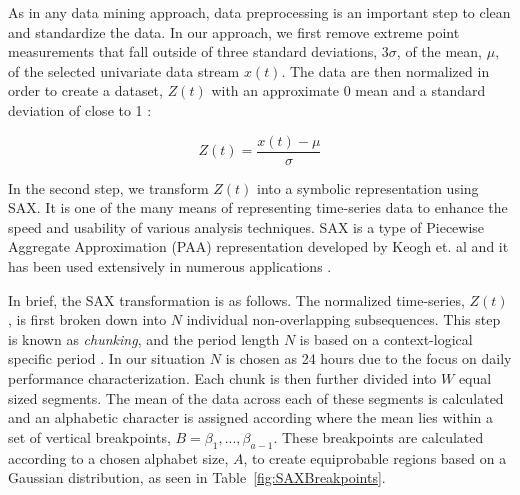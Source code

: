 As in any data mining approach, data preprocessing is an important step to clean and standardize the data. In our approach, we first remove extreme point measurements that fall outside of three standard deviations, 3$\sigma$, of the mean, $\mu$, of the selected univariate data stream $x(t)$. The data are then normalized in order to create a dataset, $Z(t)$ with an approximate 0 mean and a standard deviation of close to 1 \cite{goldin_similiarity_1995}:

\begin{equation}
Z(t)=\frac{x(t) -\mu}{\sigma}
\end{equation}

In the second step, we transform $Z(t)$ into a symbolic representation using SAX. It is one of the many means of representing time-series data to enhance the speed and usability of various analysis techniques. SAX is a type of Piecewise Aggregate Approximation (PAA) representation developed by Keogh et. al and it has been used extensively in numerous applications \cite{lin_experiencing_2007}. 

In brief, the SAX transformation is as follows. The normalized time-series, $Z(t)$, is first broken down into $N$ individual non-overlapping subsequences. This step is known as \emph{chunking}, and the period length $N$ is based on a context-logical specific period \cite{lin_visualizing_2005}. In our situation $N$ is chosen as 24 hours due to the focus on daily performance characterization.  Each chunk is then further divided into $W$ equal sized segments. The mean of the data across each of these segments is calculated and an alphabetic character is assigned according where the mean lies within a set of vertical breakpoints, $B=\beta_1,...,\beta_{a-1}$. These breakpoints are calculated according to a chosen alphabet size, $A$, to create equiprobable regions based on a Gaussian distribution, as seen in Table~\ref{fig:SAXBreakpoints}.